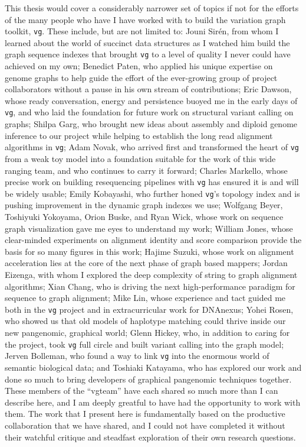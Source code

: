 \begin{acknowledgements}
  This thesis would cover a considerably narrower set of topics if not for the efforts of the many people who have I have worked with to build the variation graph toolkit, {\tt vg}.
  These include, but are not limited to:
  Jouni Sir\'{e}n, from whom I learned about the world of succinct data structures as I watched him build the graph sequence indexes that brought {\tt vg} to a level of quality I never could have achieved on my own;
  Benedict Paten, who applied his unique expertise on genome graphs to help guide the effort of the ever-growing group of project collaborators without a pause in his own stream of contributions;
  Eric Dawson, whose ready conversation, energy and persistence buoyed me in the early days of {\tt vg}, and who laid the foundation for future work on structural variant calling on graphs;
  Shilpa Garg, who brought new ideas about assembly and diploid genome inference to our project while helping to establish the long read alignment algorithms in {\tt vg};
  Adam Novak, who arrived first and transformed the heart of {\tt vg} from a weak toy model into a foundation suitable for the work of this wide ranging team, and who continues to carry it forward;
  Charles Markello, whose precise work on building resequencing pipelines with {\tt vg} has ensured it is and will be widely usable;
  Emily Kobayashi, who further honed {\tt vg}'s topology index and is pushing improvement in the dynamic graph indexes we use;
  Wolfgang Beyer, Toshiyuki Yokoyama, Orion Buske, and Ryan Wick, whose work on sequence graph visualization gave me eyes to understand my work;
  William Jones, whose clear-minded experiments on alignment identity and score comparison provide the basis for so many figures in this work;
  Hajime Suzuki, whose work on alignment acceleration lies at the core of the next phase of graph based mappers;
  Jordan Eizenga, with whom I explored the deep complexity of string to graph alignment algorithms;
  Xian Chang, who is driving the next high-performance paradigm for sequence to graph alignment;
  Mike Lin, whose experience and tact guided me both in the {\tt vg} project and in extracurricular work for DNAnexus;
  Yohei Rosen, who showed us that old models of haplotype matching could thrive inside our new pangenomic, graphical world;
  Glenn Hickey, who, in addition to caring for the project, took {\tt vg} full circle and built variant calling into the graph model;
  Jerven Bolleman, who found a way to link {\tt vg} into the enormous world of semantic biological data;
  and Toshiaki Katayama, who has explored our work and done so much to bring developers of graphical pangenomic techniques together.
  These members of the ``vgteam'' have each shared so much more than I can describe here, and I am deeply greatful to have had the opportunity to work with them.
  The work that I present here is fundamentally based on the productive collaboration that we have shared, and I could not have completed it without their watchful critique and steadfast exploration of their own research questions.


\end{acknowledgements}
